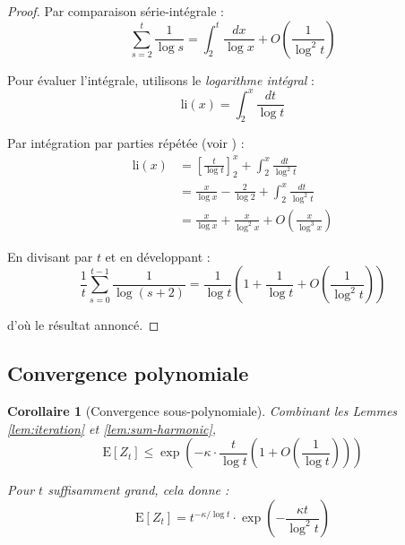 \documentclass[12pt,a4paper]{article}
\newtheorem{corollary}[theorem]{Corollaire}
\theoremstyle{definition}
\theoremstyle{remark}
\newcommand{\E}{\text{E}}
\begin{document}
	\begin{proof}
		Par comparaison série-intégrale :
		\begin{equation}
			\sum_{s=2}^t \frac{1}{\log s} = \int_2^t \frac{dx}{\log x} + O\left(\frac{1}{\log^2 t}\right)
		\end{equation}
		
		Pour évaluer l'intégrale, utilisons le \emph{logarithme intégral} :
		\begin{equation}
			\text{li}(x) = \int_2^x \frac{dt}{\log t}
		\end{equation}
		
		Par intégration par parties répétée (voir \cite{hardy1979introduction}) :
		\begin{align}
			\text{li}(x) &= \left[\frac{t}{\log t}\right]_2^x + \int_2^x \frac{dt}{\log^2 t} \\
			&= \frac{x}{\log x} - \frac{2}{\log 2} + \int_2^x \frac{dt}{\log^2 t} \\
			&= \frac{x}{\log x} + \frac{x}{\log^2 x} + O\left(\frac{x}{\log^3 x}\right)
		\end{align}
		
		En divisant par $t$ et en développant :
		\begin{equation}
			\frac{1}{t}\sum_{s=0}^{t-1} \frac{1}{\log(s+2)} = \frac{1}{\log t} \left(1 + \frac{1}{\log t} + O\left(\frac{1}{\log^2 t}\right)\right)
		\end{equation}
		
		d'où le résultat annoncé.
	\end{proof}
	

	
	\subsection{Convergence polynomiale}
	
	\begin{corollary}[Convergence sous-polynomiale]\label{cor:polynomial}
		Combinant les Lemmes \ref{lem:iteration} et \ref{lem:sum-harmonic},
		\begin{equation}
			\E[Z_t] \leq \exp\left(-\kappa \cdot \frac{t}{\log t} \left(1 + O\left(\frac{1}{\log t}\right)\right)\right)
		\end{equation}
		
		Pour $t$ suffisamment grand, cela donne :
		\begin{equation}
			\E[Z_t] = t^{-\kappa/\log t} \cdot \exp\left(-\frac{\kappa t}{\log^2 t}\right)
		\end{equation}
		
		\end{corollary}
	
\end{document}
